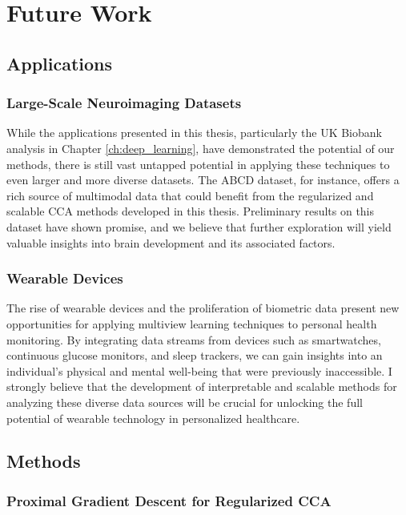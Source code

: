 \section{Future Work}

\subsection{Applications}

\subsubsection{Large-Scale Neuroimaging Datasets}

While the applications presented in this thesis, particularly the UK Biobank analysis in Chapter \ref{ch:deep_learning}, have demonstrated the potential of our methods, there is still vast untapped potential in applying these techniques to even larger and more diverse datasets. The ABCD dataset, for instance, offers a rich source of multimodal data that could benefit from the regularized and scalable CCA methods developed in this thesis. Preliminary results on this dataset have shown promise, and we believe that further exploration will yield valuable insights into brain development and its associated factors.

\subsubsection{Wearable Devices}

The rise of wearable devices and the proliferation of biometric data present new opportunities for applying multiview learning techniques to personal health monitoring. By integrating data streams from devices such as smartwatches, continuous glucose monitors, and sleep trackers, we can gain insights into an individual's physical and mental well-being that were previously inaccessible. I strongly believe that the development of interpretable and scalable methods for analyzing these diverse data sources will be crucial for unlocking the full potential of wearable technology in personalized healthcare.

\subsection{Methods}

\subsubsection{Proximal Gradient Descent for Regularized CCA}

